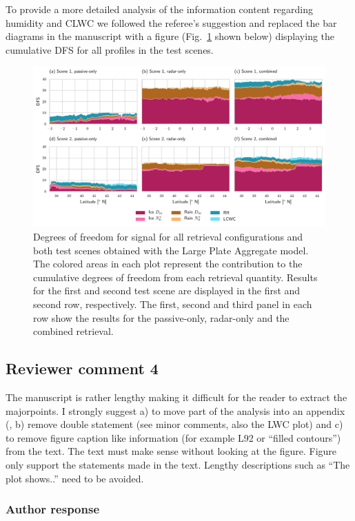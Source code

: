 To provide a more detailed analysis of the information content regarding
humidity and CLWC we followed the referee's suggestion and replaced the bar
diagrams in the manuscript with a figure (Fig.~\ref{fig:dfs} shown below)
displaying the cumulative DFS for all profiles in the test scenes.

\begin{figure}[!hbpt]
  \centering
  \includegraphics[width=\textwidth]{../plots/dfs}
\caption{Degrees of freedom for signal for all retrieval configurations and both
  test scenes obtained with the Large Plate Aggregate model. The colored areas
  in each plot represent the contribution to the cumulative degrees of freedom
  from each retrieval quantity. Results for the first and second test scene
  are displayed in the first and second row, respectively. The first, second
  and third panel in each row show the results for the passive-only, radar-only
  and the combined retrieval.}
\label{fig:dfs}
\end{figure}

\subsection*{Reviewer comment 4}

The manuscript is rather lengthy making it difficult for the reader to
extract the majorpoints. I strongly suggest a) to move part of the analysis into
an appendix (, b) remove double statement (see minor comments, also the LWC
plot) and c) to remove figure caption like information (for example L92 or
“filled contours”) from the text. The text must make sense without looking at
the figure. Figure only support the statements made in the text. Lengthy
descriptions such as ``The plot shows..'' need to be avoided.

\subsubsection*{Author response}

